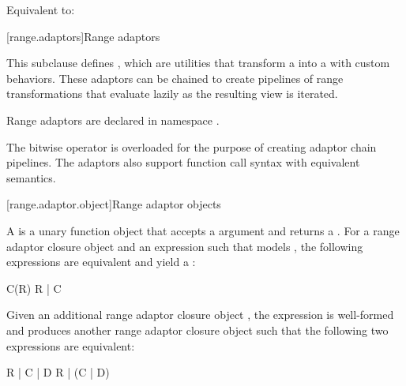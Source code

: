 \begin{itemdescr}
\pnum
\effects
Equivalent to: 
\end{itemdescr}

[range.adaptors]{Range adaptors}

\pnum
This subclause defines , which are utilities that transform a
 into a  with custom behaviors. These
adaptors can be chained to create pipelines of range transformations that
evaluate lazily as the resulting view is iterated.

\pnum
Range adaptors are declared in namespace .

\pnum
The bitwise  operator is overloaded for the purpose of creating adaptor chain
pipelines. The adaptors also support function call syntax with equivalent
semantics.

\pnum
\begin{example}
\end{example}

[range.adaptor.object]{Range adaptor objects}

\pnum
A  is a unary function object that accepts
a  argument and returns a . For
a range adaptor closure object  and an expression  such that
 models , the following
expressions are equivalent and yield a :

\begin{codeblock}
C(R)
R | C
\end{codeblock}

Given an additional range adaptor closure object ,
the expression  is well-formed and produces another range adaptor
closure object such that the following two expressions are equivalent:

\begin{codeblock}
R | C | D
R | (C | D)
\end{codeblock}

